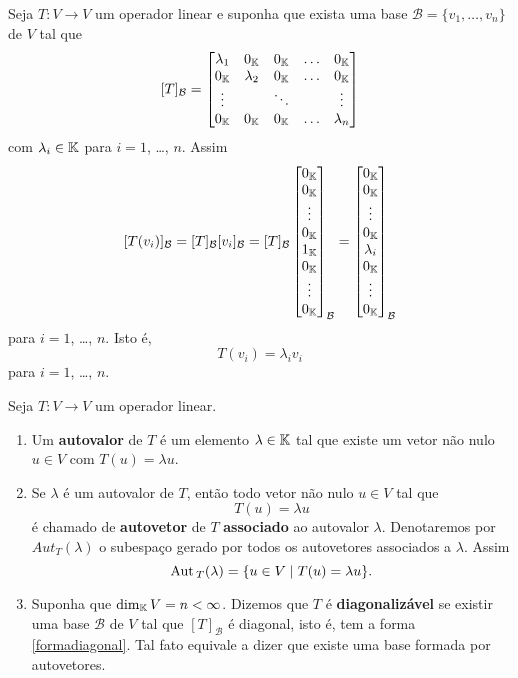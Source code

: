Seja $T : V \to V$ um operador linear e suponha que exista uma base $\mathcal{B} = \{v_1,\dots,v_n\}$ de $V$ tal que
\begin{align}\label{formadiagonal}
	[T]_\mathcal{B} = \begin{bmatrix}
		\lambda_1 & 0_{\mathbb{K}} & 0_{\mathbb{K}} & \dots & 0_{\mathbb{K}}\\
		0_{\mathbb{K}} & \lambda_2 & 0_{\mathbb{K}} & \dots & 0_{\mathbb{K}}\\
		\vdots & & \ddots & & \vdots\\
		0_{\mathbb{K}} & 0_{\mathbb{K}} & 0_{\mathbb{K}} & \dots & \lambda_n
	\end{bmatrix}
\end{align}
com $\lambda_i \in \mathbb{K}$ para $i = 1$, \dots, $n$. Assim
\[
	[T(v_i)]_\mathcal{B} = [T]_\mathcal{B}[v_i]_\mathcal{B} = [T]_\mathcal{B}\begin{bmatrix}
		0_{\mathbb{K}}\\
		0_{\mathbb{K}}\\
		\vdots\\
		0_{\mathbb{K}}\\
		1_{\mathbb{K}}\\
		0_{\mathbb{K}}\\
		\vdots\\
		0_{\mathbb{K}}
	\end{bmatrix}_\mathcal{B} = \begin{bmatrix}
		0_{\mathbb{K}}\\
		0_{\mathbb{K}}\\
		\vdots\\
		0_{\mathbb{K}}\\
		\lambda_i\\
		0_{\mathbb{K}}\\
		\vdots\\
		0_{\mathbb{K}}
	\end{bmatrix}_\mathcal{B}
\]
para $i = 1$, \dots, $n$. Isto \'e,
\[
	T(v_i) = \lambda_i v_i
\]
para $i = 1$, \dots, $n$.

\begin{definicao}
	Seja $T : V \to V$ um operador linear.
	\begin{enumerate}[label=({\roman*})]
		\item Um \textbf{autovalor} de $T$ \'e um elemento $\lambda \in \mathbb{K}$ tal que existe um vetor n\~ao nulo $u \in V$ com $T(u) = \lambda u$.
		\item Se $\lambda$ \'e um autovalor de $T$, ent\~ao todo vetor n\~ao nulo $u \in V$ tal que
		\[
			T(u) = \lambda u
		\]
		\'e chamado de \textbf{autovetor} de $T$ \textbf{associado} ao autovalor $\lambda$. Denotaremos por $Aut_T(\lambda)$ o subespa\c{c}o gerado por todos os autovetores associados a $\lambda$. Assim
		\[
			{\rm Aut\,}_T(\lambda) = \{u \in V \mid T(u) = \lambda u\}.
		\]
		\item Suponha que $\dim_{\mathbb{K}} V = n < \infty$. Dizemos que $T$ \'e \textbf{diagonaliz\'avel} se existir uma base $\mathcal{B}$ de $V$ tal que $[T]_\mathcal{B}$ \'e diagonal, isto \'e, tem a forma \eqref{formadiagonal}. Tal fato equivale a dizer que existe uma base formada por autovetores.
	\end{enumerate}
\end{definicao}

